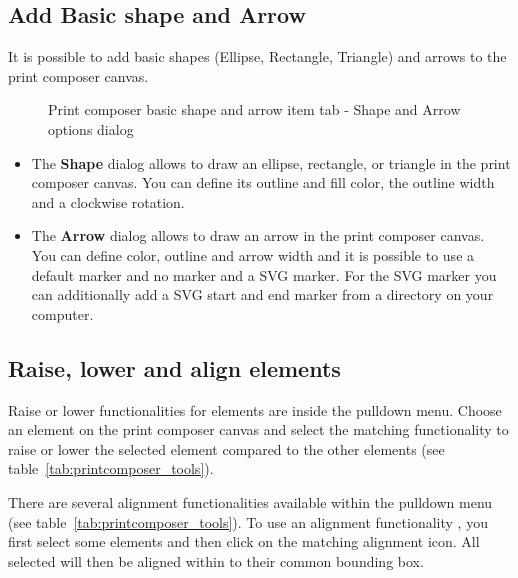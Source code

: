 \subsection{Add Basic shape and Arrow}

It is possible to add basic shapes (Ellipse, Rectangle, Triangle) and arrows
to the print composer canvas. 

\begin{figure}[ht]
\centering
\caption{Print composer basic shape and arrow item tab - Shape and Arrow
options dialog \nixcaption}\label{fig:shapearrow}
\goodgap
{}
\end{figure}

\begin{itemize}
\item The \textbf{Shape} dialog allows to draw an ellipse, rectangle, or
triangle in the print composer canvas. You can define its outline and fill
color, the outline width and a clockwise rotation.
\item The \textbf{Arrow} dialog allows to draw an arrow in the print composer
canvas. You can define color, outline and arrow width and it is possible to
use a default marker and no marker and a SVG marker. For the SVG marker you
can additionally add a SVG start and end marker from a directory on your
computer.
\end{itemize}

\subsection{Raise, lower and align elements}

Raise or lower functionalities for elements are inside the
 pulldown menu. Choose an
element on the print composer canvas and select the matching functionality to
raise or lower the selected element compared to the other elements (see
table~\ref{tab:printcomposer_tools}). 

There are several alignment functionalities available within the
 pulldown menu (see
table~\ref{tab:printcomposer_tools}). To use an alignment functionality , you
first select some elements and then click on the matching alignment icon. All
selected will then be aligned within to their common bounding box.       

